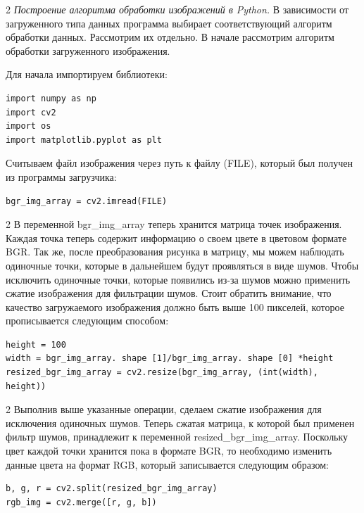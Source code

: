 \begin{multicols}{2}
\emph{Построение алгоритма обработки изображений в Python.} В
зависимости от загруженного типа данных программа выбирает
соответствующий алгоритм обработки данных. Рассмотрим их отдельно. В
начале рассмотрим алгоритм обработки загруженного изображения.

Для начала импортируем библиотеки:
\end{multicols}

{\small
\begin{verbatim}
import numpy as np
import cv2
import os
import matplotlib.pyplot as plt
\end{verbatim}
}

Считываем файл изображения через путь к файлу (FILE), который был
получен из программы загрузчика:

{\small
\begin{verbatim}
bgr_img_array = cv2.imread(FILE)
\end{verbatim}
}

\begin{multicols}{2}
В переменной bgr\_img\_array теперь хранится матрица точек изображения.
Каждая точка теперь содержит информацию о своем цвете в цветовом формате
BGR. Так же, после преобразования рисунка в матрицу, мы можем наблюдать
одиночные точки, которые в дальнейшем будут проявляться в виде шумов.
Чтобы исключить одиночные точки, которые появились из-за шумов можно
применить сжатие изображения для фильтрации шумов. Стоит обратить
внимание, что качество загружаемого изображения должно быть выше 100
пикселей, которое прописывается следующим способом:
\end{multicols}

{\small
\begin{verbatim}
height = 100
width = bgr_img_array. shape [1]/bgr_img_array. shape [0] *height
resized_bgr_img_array = cv2.resize(bgr_img_array, (int(width), height))
\end{verbatim}
}

\begin{multicols}{2}
Выполнив выше указанные операции, сделаем сжатие изображения для
исключения одиночных шумов. Теперь сжатая матрица, к которой был
применен фильтр шумов, принадлежит к переменной
resized\_bgr\_img\_array. Поскольку цвет каждой точки хранится пока в
формате BGR, то необходимо изменить данные цвета на формат RGB, который
записывается следующим образом:
\end{multicols}

{\small
\begin{verbatim}
b, g, r = cv2.split(resized_bgr_img_array)
rgb_img = cv2.merge([r, g, b])
\end{verbatim}
}

